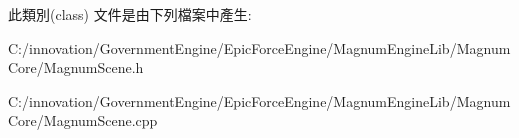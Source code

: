 此類別(class) 文件是由下列檔案中產生\+:\begin{DoxyCompactItemize}
\item 
C\+:/innovation/\+Government\+Engine/\+Epic\+Force\+Engine/\+Magnum\+Engine\+Lib/\+Magnum\+Core/Magnum\+Scene.\+h\item 
C\+:/innovation/\+Government\+Engine/\+Epic\+Force\+Engine/\+Magnum\+Engine\+Lib/\+Magnum\+Core/Magnum\+Scene.\+cpp\end{DoxyCompactItemize}
